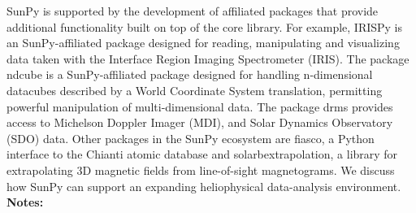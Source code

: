 \documentclass{report}
\begin{document}
{{{{{{{{{{{{{{{{{{{{{{{{{{{{{{{{{{{{{{{{{{{{{{{{{{{{{{{{{{{{{{{{{{{{{{{{{{{{{{{SunPy is supported by the development of affiliated packages that provide additional functionality built on top of the core library. For example, IRISPy is an SunPy-affiliated package designed for reading, manipulating and visualizing data taken with the Interface Region Imaging Spectrometer (IRIS).  The package ndcube is a SunPy-affiliated package designed for handling n-dimensional datacubes described by a World Coordinate System translation, permitting powerful manipulation of multi-dimensional data. The package drms provides access to Michelson Doppler Imager (MDI), and Solar Dynamics Observatory (SDO) data.  Other packages in the SunPy ecosystem are fiasco, a Python interface to the Chianti atomic database and solarbextrapolation, a library for extrapolating 3D magnetic fields from line-of-sight magnetograms.  We discuss how SunPy can support an expanding heliophysical data-analysis environment.\newline
{\bf Notes:}\newline
{\newpage
}}}}}}}}}}}}}}}}}}}}}}}}}}}}}}}}}}}}}}}}}}}}}}}}}}}}}}}}}}}}}}}}}}}}}}}}}}}}}}}}
\end{document}
